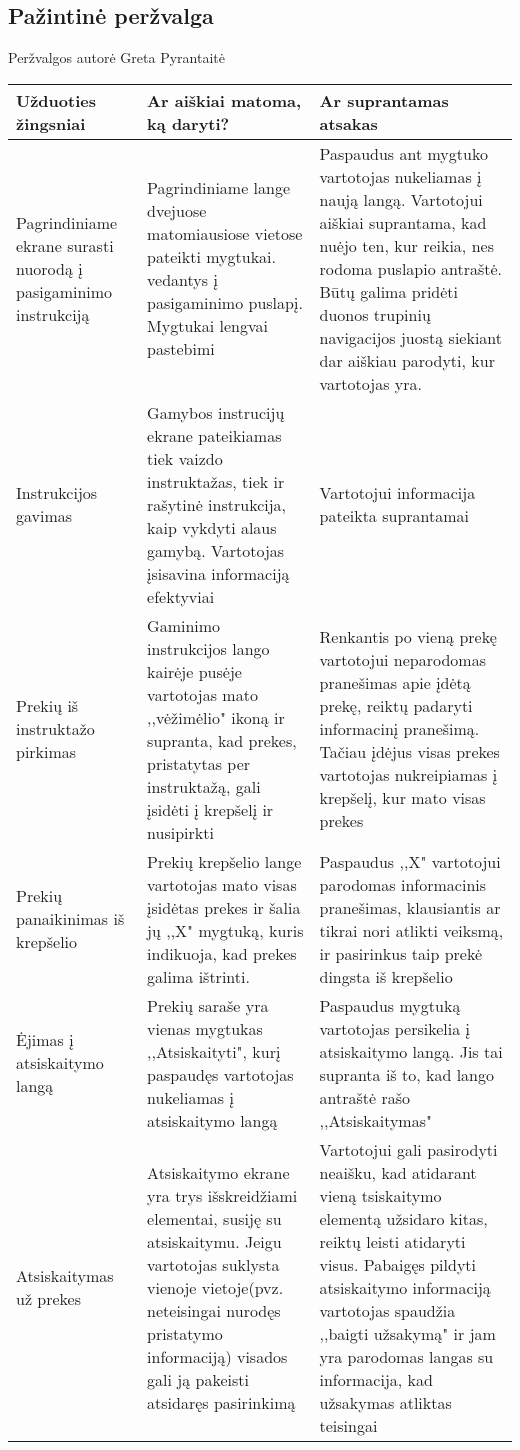 \documentclass[oneside]{VUMIFPSkursinis}
\begin{document}
	\subsection{Pažintinė peržvalga}
Peržvalgos autorė Greta Pyrantaitė
\begin{center}
    \begin{tabular}{ |p{4cm}| p{6cm} | p{7cm} | }
    \hline
	Užduoties žingsniai & Ar aiškiai matoma, ką daryti? & Ar suprantamas atsakas \\ \hline
	Pagrindiniame ekrane surasti nuorodą į pasigaminimo instrukciją & Pagrindiniame lange dvejuose matomiausiose vietose pateikti mygtukai. vedantys į pasigaminimo puslapį.
	Mygtukai lengvai pastebimi & Paspaudus ant mygtuko vartotojas nukeliamas į naują langą.
	Vartotojui aiškiai suprantama, kad nuėjo ten, kur reikia, nes rodoma puslapio antraštė. Būtų galima pridėti duonos trupinių navigacijos juostą siekiant dar aiškiau parodyti, kur vartotojas yra. \\ \hline
	Instrukcijos gavimas & Gamybos instrucijų ekrane pateikiamas tiek vaizdo instruktažas, tiek ir rašytinė instrukcija, kaip vykdyti alaus gamybą. Vartotojas įsisavina informaciją efektyviai & Vartotojui informacija pateikta suprantamai \\ \hline
	Prekių iš instruktažo pirkimas & Gaminimo instrukcijos lango kairėje pusėje vartotojas mato ,,vėžimėlio" ikoną ir supranta, kad prekes, pristatytas per instruktažą, gali įsidėti į krepšelį ir nusipirkti & Renkantis po vieną prekę vartotojui neparodomas pranešimas apie įdėtą prekę, reiktų padaryti informacinį pranešimą. Tačiau įdėjus visas prekes vartotojas nukreipiamas į krepšelį, kur mato visas prekes \\ \hline
	Prekių panaikinimas iš krepšelio & Prekių krepšelio lange vartotojas mato visas įsidėtas prekes ir šalia jų ,,X" mygtuką, kuris indikuoja, kad prekes galima ištrinti. & Paspaudus ,,X" vartotojui parodomas informacinis pranešimas, klausiantis ar tikrai nori atlikti veiksmą, ir pasirinkus taip prekė dingsta iš krepšelio \\ \hline
	Ėjimas į atsiskaitymo langą & Prekių saraše yra vienas mygtukas ,,Atsiskaityti", kurį paspaudęs vartotojas nukeliamas į atsiskaitymo langą & Paspaudus mygtuką vartotojas persikelia į atsiskaitymo langą. Jis tai supranta iš to, kad lango antraštė rašo ,,Atsiskaitymas" \\ \hline
	Atsiskaitymas už prekes & Atsiskaitymo ekrane yra trys išskreidžiami elementai, susiję su atsiskaitymu. Jeigu vartotojas suklysta vienoje vietoje(pvz. neteisingai nurodęs pristatymo informaciją) visados gali ją pakeisti atsidaręs pasirinkimą & Vartotojui gali pasirodyti neaišku, kad atidarant vieną tsiskaitymo elementą užsidaro kitas, reiktų leisti atidaryti visus. Pabaigęs pildyti atsiskaitymo informaciją vartotojas spaudžia ,,baigti užsakymą" ir jam yra parodomas langas su informacija, kad užsakymas atliktas teisingai \\ \hline

\end{tabular}
\end{center}
\end{document}
